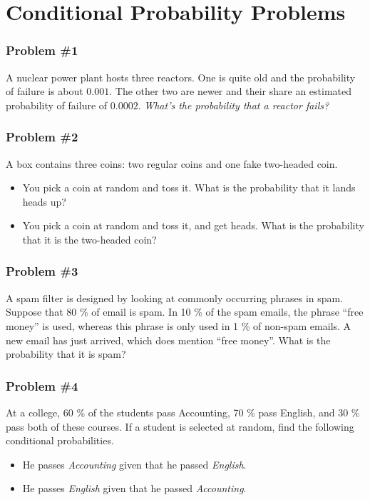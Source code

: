 \documentclass[aspectratio=169,11pt,usenames,dvipsnames]{beamer}
\begin{document}
\section{Conditional Probability Problems}

\begin{frame}
 \frametitle{Problem \#1}
 A nuclear power plant hosts three reactors. One is quite old and the
 probability of failure is about $0.001$. The other two are newer and their
 share an estimated probability of failure of $0.0002$. \emph{What's the
 probability that a reactor fails?}
\end{frame}

\begin{frame}
 \frametitle{Problem \#2}
 A box contains three coins: two regular coins and one fake two-headed coin.
 \begin{itemize}
  \item You pick a coin at random and toss it. What is the probability that it
   lands heads up?
  \item You pick a coin at random and toss it, and get heads. What is the
   probability that it is the two-headed coin?
 \end{itemize}
\end{frame}

\begin{frame}
 \frametitle{Problem \#3}
 A spam filter is designed by looking at commonly occurring phrases in spam.
 Suppose that 80 \% of email is spam. In 10 \% of the spam emails, the phrase
 “free money” is used, whereas this phrase is only used in 1 \% of non-spam
 emails. A new email has just arrived, which does mention “free money”. What is
 the probability that it is spam?
\end{frame}

\begin{frame}
 \frametitle{Problem \#4}
 At a college, 60 \% of the students pass Accounting, 70 \% pass English, and 30
 \% pass both of these courses. If a student is selected at random, find the
 following conditional probabilities.
 \begin{itemize}
  \item He passes \emph{Accounting} given that he passed \emph{English}.
  \item He passes \emph{English} given that he passed \emph{Accounting}.
 \end{itemize}
\end{frame}
\end{document}
